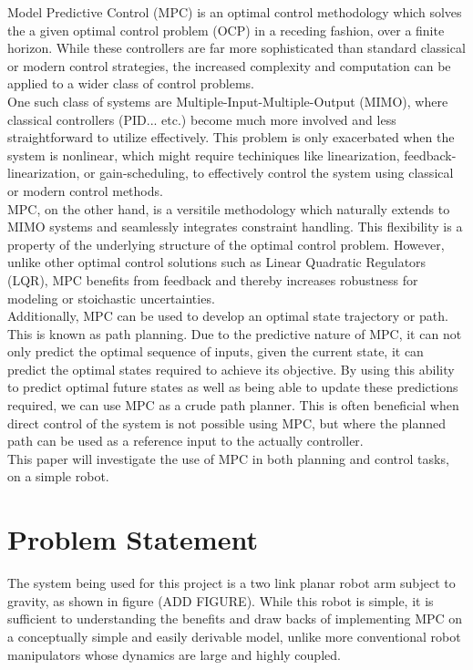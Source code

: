 \documentclass[journal]{IEEEtran}
\begin{document}
Model Predictive Control (MPC) is an optimal control methodology which solves the a given optimal control problem (OCP) in a receding fashion, over a finite horizon. While these controllers are far more sophisticated than standard classical or modern control strategies, the increased complexity and computation can be applied to a wider class of control problems. \\

One such class of systems are Multiple-Input-Multiple-Output (MIMO), where classical controllers (PID... etc.) become much more involved and less straightforward to utilize effectively. This problem is only exacerbated when the system is nonlinear, which might require techiniques like linearization, feedback-linearization, or gain-scheduling, to effectively control the system using classical or modern control methods. \\

MPC, on the other hand, is a versitile methodology which naturally extends to MIMO systems and seamlessly integrates constraint handling. This flexibility is a property of the underlying structure of the optimal control problem. However, unlike other optimal control solutions such as Linear Quadratic Regulators (LQR), MPC benefits from feedback and thereby increases robustness for modeling or stoichastic uncertainties.  \\

Additionally, MPC can be used to develop an optimal state trajectory or path. This is known as path planning. Due to the predictive nature of MPC, it can not only predict the optimal sequence of inputs, given the current state, it can predict the optimal states required to achieve its objective. By using this ability to predict optimal future states as well as being able to update these predictions required, we can use MPC as a crude path planner. This is often beneficial when direct control of the system is not possible using MPC, but where the planned path can be used as a reference input to the actually controller. \\

This paper will investigate the use of MPC in both planning and control tasks, on a simple robot.


\section{Problem Statement}

The system being used for this project is a two link planar robot arm subject to gravity, as shown in figure (ADD FIGURE). While this robot is simple, it is sufficient to understanding the benefits and draw backs of implementing MPC on a conceptually simple and easily derivable model, unlike more conventional robot manipulators whose dynamics are large and highly coupled.
\end{document}
